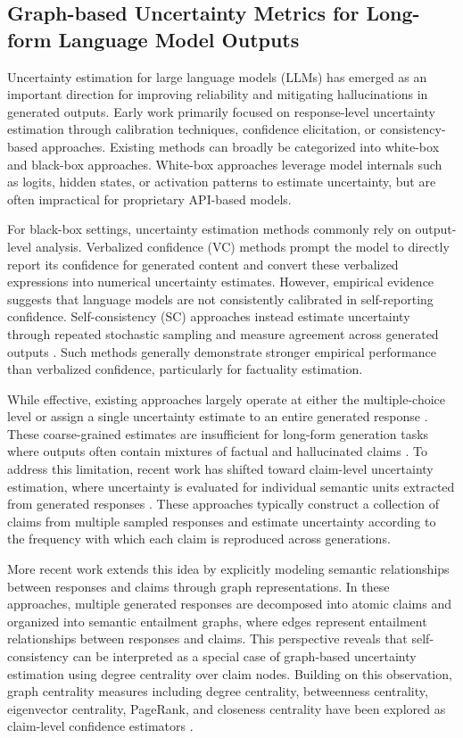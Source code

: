 \subsection{Graph-based Uncertainty Metrics for Long-form Language Model Outputs}

Uncertainty estimation for large language models (LLMs) has emerged as an important direction for improving reliability and mitigating hallucinations in generated outputs. Early work primarily focused on response-level uncertainty estimation through calibration techniques, confidence elicitation, or consistency-based approaches. Existing methods can broadly be categorized into white-box and black-box approaches. White-box approaches leverage model internals such as logits, hidden states, or activation patterns to estimate uncertainty, but are often impractical for proprietary API-based models.

For black-box settings, uncertainty estimation methods commonly rely on output-level analysis. Verbalized confidence (VC) methods prompt the model to directly report its confidence for generated content and convert these verbalized expressions into numerical uncertainty estimates. However, empirical evidence suggests that language models are not consistently calibrated in self-reporting confidence. Self-consistency (SC) approaches instead estimate uncertainty through repeated stochastic sampling and measure agreement across generated outputs . Such methods generally demonstrate stronger empirical performance than verbalized confidence, particularly for factuality estimation.

While effective, existing approaches largely operate at either the multiple-choice level or assign a single uncertainty estimate to an entire generated response . These coarse-grained estimates are insufficient for long-form generation tasks where outputs often contain mixtures of factual and hallucinated claims . To address this limitation, recent work has shifted toward claim-level uncertainty estimation, where uncertainty is evaluated for individual semantic units extracted from generated responses . These approaches typically construct a collection of claims from multiple sampled responses and estimate uncertainty according to the frequency with which each claim is reproduced across generations.

More recent work extends this idea by explicitly modeling semantic relationships between responses and claims through graph representations. In these approaches, multiple generated responses are decomposed into atomic claims and organized into semantic entailment graphs, where edges represent entailment relationships between responses and claims. This perspective reveals that self-consistency can be interpreted as a special case of graph-based uncertainty estimation using degree centrality over claim nodes. Building on this observation, graph centrality measures including degree centrality, betweenness centrality, eigenvector centrality, PageRank, and closeness centrality have been explored as claim-level confidence estimators .

